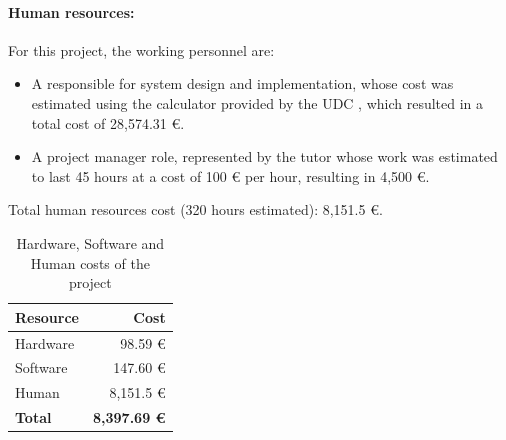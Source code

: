 \paragraph{Human resources:}

For this project, the working personnel are:

\begin{itemize}
	\item A responsible for system design and implementation, whose cost was estimated using the calculator provided by the UDC \cite{ref60}, which resulted in a total cost of 28,574.31 €.
	\item A project manager role, represented by the tutor whose work was estimated to last 45 hours at a cost of 100 € per hour, resulting in 4,500 €.
\end{itemize}

Total human resources cost (320 hours estimated): 8,151.5 €.

\begin{table}[H]
	\centering
	\begin{tabular}{|l|r|}
		\hline
		\textbf{Resource} & \textbf{Cost} \\ \hline
		Hardware & 98.59 € \\ \hline
		Software & 147.60 € \\ \hline
		Human & 8,151.5 € \\ \hline
		\textbf{Total} & \textbf{8,397.69 €} \\ \hline
	\end{tabular}
	\caption{Hardware, Software and Human costs of the project}
	\label{tab:costs}
\end{table}
